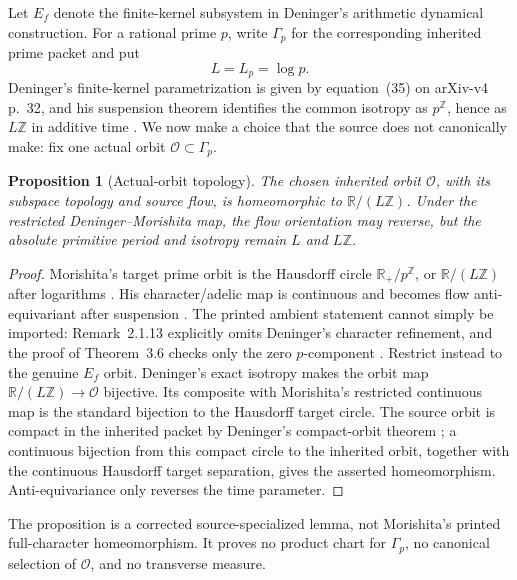 \documentclass[11pt]{article}
\newtheorem{proposition}[theorem]{Proposition}
\theoremstyle{definition}
\newcommand{\R}{\mathbb{R}}
\newcommand{\Z}{\mathbb{Z}}
\begin{document}
Let \(E_f\) denote the finite-kernel subsystem in Deninger's arithmetic dynamical construction.  For a rational prime \(p\), write \(\Gamma_p\) for the corresponding inherited prime packet and put
\[
 L=L_p=\log p.
\]
Deninger's finite-kernel parametrization is given by equation~(35) on arXiv-v4 p.~32, and his suspension theorem identifies the common isotropy as \(p^{\Z}\), hence as \(L\Z\) in additive time \cite[equation~(35), p.~32; Theorem~6.1, pp.~38--39]{Deninger2026}.  We now make a choice that the source does not canonically make: fix one actual orbit \(\mathcal O\subset\Gamma_p\).

\begin{proposition}[Actual-orbit topology]\label{prop:orbit}
The chosen inherited orbit \(\mathcal O\), with its subspace topology and source flow, is homeomorphic to \(\R/(L\Z)\).  Under the restricted Deninger--Morishita map, the flow orientation may reverse, but the absolute primitive period and isotropy remain \(L\) and \(L\Z\).
\end{proposition}

\begin{proof}
Morishita's target prime orbit is the Hausdorff circle \(\R_+/p^{\Z}\), or \(\R/(L\Z)\) after logarithms \cite[equation~(1.1.5), p.~5]{Morishita2026}.  His character/adelic map is continuous and becomes flow anti-equivariant after suspension \cite[Lemmas~3.4--3.5, pp.~23--24]{Morishita2026}.  The printed ambient statement cannot simply be imported: Remark~2.1.13 explicitly omits Deninger's character refinement, and the proof of Theorem~3.6 checks only the zero \(p\)-component \cite[Remark~2.1.13, p.~13; Theorem~3.6 discussion, pp.~24--25]{Morishita2026}.  Restrict instead to the genuine \(E_f\) orbit.  Deninger's exact isotropy makes the orbit map \(\R/(L\Z)\to\mathcal O\) bijective.  Its composite with Morishita's restricted continuous map is the standard bijection to the Hausdorff target circle.  The source orbit is compact in the inherited packet by Deninger's compact-orbit theorem \cite[Theorem~4.2, pp.~11--12]{Deninger2023}; a continuous bijection from this compact circle to the inherited orbit, together with the continuous Hausdorff target separation, gives the asserted homeomorphism.  Anti-equivariance only reverses the time parameter.
\end{proof}

The proposition is a corrected source-specialized lemma, not Morishita's printed full-character homeomorphism.  It proves no product chart for \(\Gamma_p\), no canonical selection of \(\mathcal O\), and no transverse measure.
\end{document}
